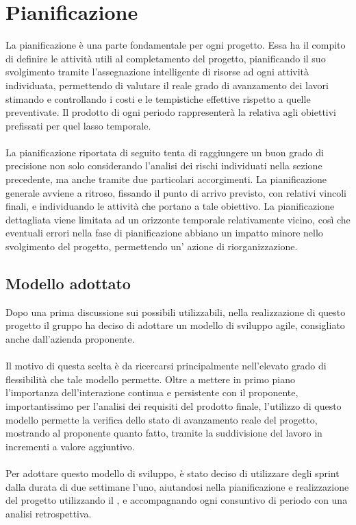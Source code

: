 \chapter{Pianificazione}\label{chap:pianificazione}
La pianificazione è una parte fondamentale per ogni progetto. Essa ha il compito di definire le attività utili al completamento del progetto, pianificando il suo svolgimento tramite l'assegnazione intelligente di risorse ad ogni attività individuata, permettendo di valutare il reale grado di avanzamento dei lavori stimando e controllando i costi e le tempistiche effettive rispetto a quelle preventivate. Il prodotto di ogni periodo rappresenterà la  relativa agli obiettivi prefissati per quel lasso temporale.\\ \\
La pianificazione riportata di seguito tenta di raggiungere un buon grado di precisione non solo considerando l'analisi dei rischi individuati nella sezione precedente, ma anche tramite due particolari accorgimenti. La pianificazione generale avviene a ritroso, fissando il punto di arrivo previsto, con relativi vincoli finali, e individuando le attività che portano a tale obiettivo. La pianificazione dettagliata viene limitata ad un orizzonte temporale relativamente vicino, così che eventuali errori nella fase di pianificazione abbiano un impatto minore nello svolgimento del progetto, permettendo un' azione di riorganizzazione. 

\section{Modello adottato}
Dopo una prima discussione sui possibili  utilizzabili, nella realizzazione di questo progetto il gruppo ha deciso di adottare un modello di sviluppo agile, consigliato anche dall'azienda proponente.\\ \\
Il motivo di questa scelta è da ricercarsi principalmente nell'elevato grado di flessibilità che tale modello permette. Oltre a mettere in primo piano l'importanza dell'interazione continua e persistente con il proponente, importantissimo per l'analisi dei requisiti del prodotto finale, l'utilizzo di questo modello permette la verifica dello stato di avanzamento reale del progetto, mostrando al proponente quanto fatto, tramite la suddivisione del lavoro in incrementi a valore aggiuntivo.\\ \\
Per adottare questo modello di sviluppo, è stato deciso di utilizzare degli sprint dalla durata di due settimane l'uno, aiutandosi nella pianificazione e realizzazione del progetto utilizzando il  , e accompagnando ogni consuntivo di periodo con una analisi retrospettiva.

